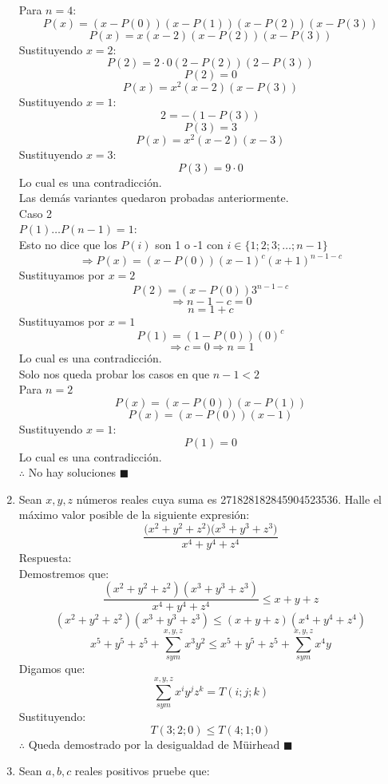 \documentclass{book}
\begin{document}
\begin{enumerate}
              Para $n=4$:
              $$P(x)=(x-P(0))(x-P(1))(x-P(2))(x-P(3))$$
              $$P(x)=x(x-2)(x-P(2))(x-P(3))$$
              Sustituyendo $x=2$:
              $$P(2)=2\cdot 0(2-P(2))(2-P(3))$$
              $$P(2)=0$$
              $$P(x)=x^2(x-2)(x-P(3))$$
              Sustituyendo $x=1$:
              $$2=-(1-P(3))$$
              $$P(3)=3$$
              $$P(x)=x^2(x-2)(x-3)$$
              Sustituyendo $x=3$:
              $$P(3)=9\cdot 0$$
              Lo cual es una contradicción.\\
              Las demás variantes quedaron probadas anteriormente.\\
              Caso 2\\ $P(1)\ldots P(n-1)=1$:\\
              Esto no dice que los $P(i)$ son 1 o -1 con $i\in\{1;2;3;\ldots;n-1\}$
              $$\Rightarrow P(x)=(x-P(0)){(x-1)}^c{(x+1)}^{n-1-c}$$
              Sustituyamos por $x=2$
              $$P(2)=(x-P(0)){3}^{n-1-c}$$
              $$\Rightarrow n-1-c=0$$
              $$n=1+c$$
              Sustituyamos por $x=1$
              $$P(1)=(1-P(0)){(0)}^c$$
              $$\Rightarrow c=0\Rightarrow n=1$$
              Lo cual es una contradicción.\\
              Solo nos queda probar los casos en que $n-1<2$\\
              Para $n=2$
              $$P(x)=(x-P(0))(x-P(1))$$
              $$P(x)=(x-P(0))(x-1)$$
              Sustituyendo $x=1$:
              $$P(1)=0$$
              Lo cual es una contradicción.\\
          $\therefore$ No hay soluciones $\blacksquare$\\
    \item Sean $x,y,z$ números reales cuya suma es 271828182845904523536. Halle el máximo valor posible de la siguiente expresión:
          $$\frac{\big(x^2+y^2+z^2\big)\big(x^3+y^3+z^3\big)}{x^4+y^4+z^4}$$
          Respuesta:\\
          Demostremos que:
          $$\frac{(x^2+y^2+z^2 )(x^3+y^3+z^3 )}{x^4+y^4+z^4 }\leq x+y+z$$
          $$(x^2+y^2+z^2 )(x^3+y^3+z^3 )\leq(x+y+z)(x^4+y^4+z^4 )$$
          $$x^5+y^5+z^5+\sum_{sym}^{x,y,z}x^3 y^2\leq x^5+y^5+z^5+\sum_{sym}^{x,y,z}x^4 y$$
          Digamos que:
          $$\sum_{sym}^{x,y,z}x^i y^j z^k =T(i; j; k)$$
          Sustituyendo:
          $$T(3; 2; 0)\leq T(4;1;0)$$
          $\therefore$ Queda demostrado por la desigualdad de Müirhead $\blacksquare$\\
    \item Sean $a,b,c$ reales positivos pruebe que:

\end{enumerate}
\end{document}
